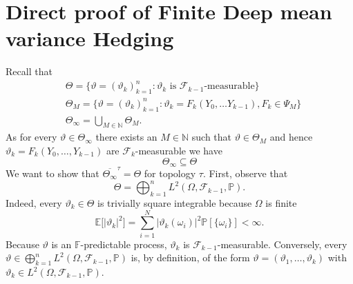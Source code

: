 \documentclass[11pt,a4paper,twoside,openany]{report}
\numberwithin{equation}{section}
\theoremstyle{plain} %
\theoremstyle{definition} %
\theoremstyle{remark} %
\begin{document}
\section{Direct proof of Finite Deep mean variance Hedging}\label{Appendix:Direct proof of Finite Deep mean variance Hedging}
    Recall that 
    \begin{align*}
        &\Theta=\{\vartheta=(\vartheta_k)_{k=1}^n:\vartheta_k \text{ is }\mathcal{F}_{k-1}\text{-measurable}\}\\
        &\Theta_M=\{\vartheta=(\vartheta_k)_{k=1}^n:\vartheta_k=F_k(Y_0,\dots Y_{k-1}),F_k\in\Psi_M\}\\
        &\Theta_{\infty}=\bigcup_{M\in\mathbb{N}}\Theta_M.
    \end{align*}
    As for every \(\vartheta\in\Theta_{\infty}\) there exists an \(M\in\mathbb{N}\) such that \(\vartheta\in\Theta_M\) and hence \(\vartheta_k=F_k(Y_0,\dots,Y_{k-1})\) are \(\mathcal{F}_{k}\)-measurable we have 
    \begin{equation*}
        \Theta_{\infty}\subseteq\Theta
    \end{equation*}
    We want to show that \(\overline{\Theta_{\infty}}^{\tau}=\Theta\) for topology \(\tau\).
   First, observe that 
    \begin{equation*}
    \Theta=\bigoplus_{k=1}^{n}L^2(\Omega,\mathcal{F}_{k-1},\mathbb{P}).
    \end{equation*}
    Indeed, every \(\vartheta_k\in\Theta\) is trivially square integrable because \(\Omega\) is finite
    \begin{equation*}
        \mathbb{E}\big[|\vartheta_k|^2\big]=\sum_{i=1}^N|\vartheta_k(\omega_i)|^2\mathbb{P}[\{\omega_i\}]<\infty.
    \end{equation*}
    Because \(\vartheta\) is an \(\mathbb{F}\)-predictable process, \(\vartheta_k\) is \(\mathcal{F}_{k-1}\)-measurable. Conversely, every \(\vartheta\in\bigoplus_{k=1}^{n}L^2(\Omega,\mathcal{F}_{k-1},\mathbb{P})\) is, by definition, of the form \(\vartheta=(\vartheta_1,\dots,\vartheta_k)\) with \(\vartheta_k\in L^2(\Omega,\mathcal{F}_{k-1},\mathbb{P})\). 
\end{document}
